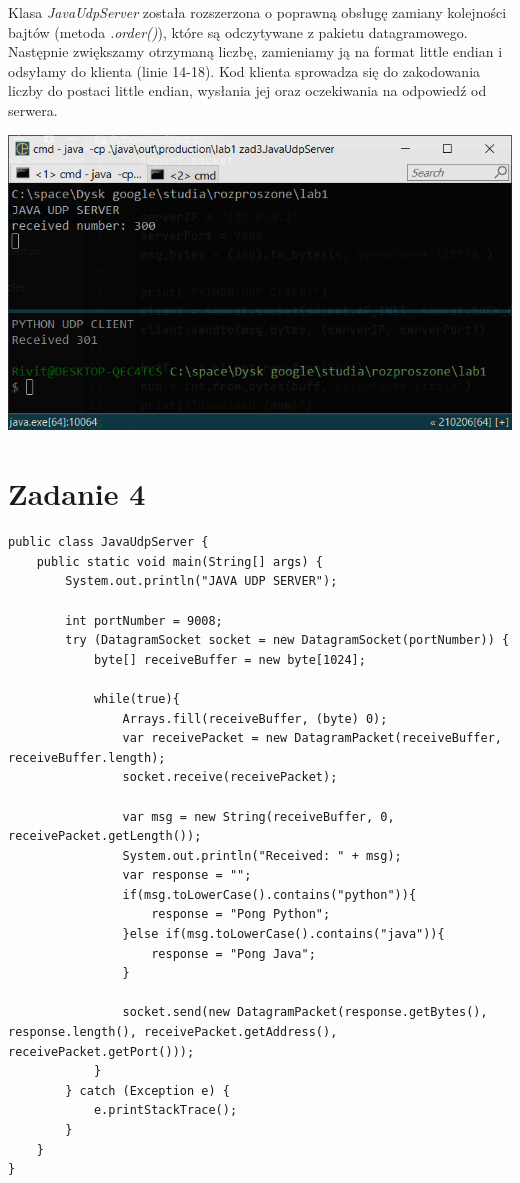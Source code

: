 \documentclass[12pt]{article}
\begin{document}
Klasa \emph{JavaUdpServer} została rozszerzona o poprawną obsługę zamiany kolejności bajtów (metoda \emph{.order()}), które są odczytywane z pakietu datagramowego. Następnie zwiększamy otrzymaną liczbę, zamieniamy ją na format little endian i odsyłamy do klienta (linie 14-18). Kod klienta sprowadza się do zakodowania liczby do postaci little endian, wysłania jej oraz oczekiwania na odpowiedź od serwera. 

\begin{center}
\centering
    \includegraphics[scale=0.8]{3.png}
\end{center}

\newpage
\section{Zadanie 4}

\begin{verbatim}
public class JavaUdpServer {
    public static void main(String[] args) {
        System.out.println("JAVA UDP SERVER");

        int portNumber = 9008;
        try (DatagramSocket socket = new DatagramSocket(portNumber)) {
            byte[] receiveBuffer = new byte[1024];

            while(true){
                Arrays.fill(receiveBuffer, (byte) 0);
                var receivePacket = new DatagramPacket(receiveBuffer, receiveBuffer.length);
                socket.receive(receivePacket);

                var msg = new String(receiveBuffer, 0, receivePacket.getLength());
                System.out.println("Received: " + msg);
                var response = "";
                if(msg.toLowerCase().contains("python")){
                    response = "Pong Python";
                }else if(msg.toLowerCase().contains("java")){
                    response = "Pong Java";
                }

                socket.send(new DatagramPacket(response.getBytes(), response.length(), receivePacket.getAddress(), receivePacket.getPort()));
            }
        } catch (Exception e) {
            e.printStackTrace();
        }
    }
}
\end{verbatim}
\end{document}
